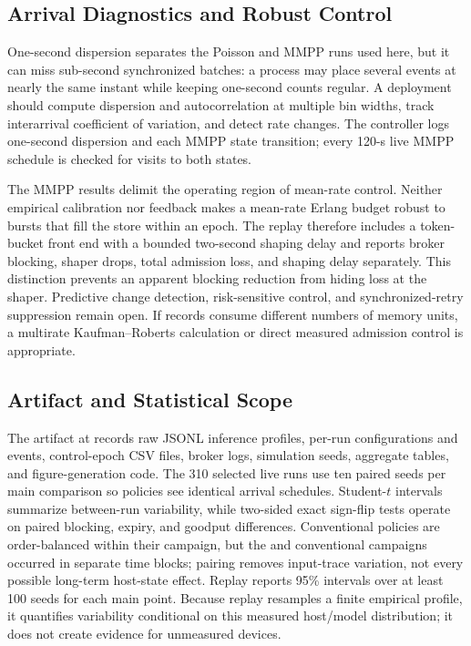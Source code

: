 \subsection{Arrival Diagnostics and Robust Control}

One-second dispersion separates the Poisson and MMPP runs used here, but it can miss sub-second synchronized batches: a process may place several events at nearly the same instant while keeping one-second counts regular. A deployment should compute dispersion and autocorrelation at multiple bin widths, track interarrival coefficient of variation, and detect rate changes. The controller logs one-second dispersion and each MMPP state transition; every 120-s live MMPP schedule is checked for visits to both states.

The MMPP results delimit the operating region of mean-rate control. Neither empirical calibration nor feedback makes a mean-rate Erlang budget robust to bursts that fill the store within an epoch. The replay therefore includes a token-bucket front end with a bounded two-second shaping delay and reports broker blocking, shaper drops, total admission loss, and shaping delay separately. This distinction prevents an apparent blocking reduction from hiding loss at the shaper. Predictive change detection, risk-sensitive control, and synchronized-retry suppression remain open. If records consume different numbers of memory units, a multirate Kaufman--Roberts calculation or direct measured admission control is appropriate.

\subsection{Artifact and Statistical Scope}

The artifact at \artifacturl{} records raw JSONL inference profiles, per-run configurations and events, control-epoch CSV files, broker logs, simulation seeds, aggregate tables, and figure-generation code. The 310 selected live runs use ten paired seeds per main comparison so policies see identical arrival schedules. Student-$t$ intervals summarize between-run variability, while two-sided exact sign-flip tests operate on paired blocking, expiry, and goodput differences. Conventional policies are order-balanced within their campaign, but the \method{} and conventional campaigns occurred in separate time blocks; pairing removes input-trace variation, not every possible long-term host-state effect. Replay reports 95\% intervals over at least 100 seeds for each main point. Because replay resamples a finite empirical profile, it quantifies variability conditional on this measured host/model distribution; it does not create evidence for unmeasured devices.

